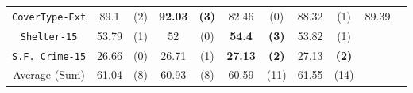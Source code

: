 \begin{table}
\begin{tabular}{c|cc|cc|cc|cc|cc}
{\tt CoverType-Ext}  &  89.1          &  (2)              &  {\bf 92.03}&  {\bf (3)}    &  82.46       &  (0)               &  88.32      & (1)           & 89.39 &    \\
{\tt Shelter-15}     &  53.79         &  (1)              &  52         &  (0)          &  {\bf 54.4}  &  {\bf (3)}         &  53.82      & (1)           &       &   \\   
{\tt S.F. Crime-15}  &  26.66         &  (0)              &  26.71      &  (1)          &  {\bf 27.13} &  {\bf (2)}         &  27.13      & {\bf (2)}     &       &   \\
\hline
Average (Sum)        &   61.04        &  (8)              & 60.93       &  (8)          &   60.59      &  (11)              &  61.55      & (14)          &       & 

\end{tabular}
\label{exp:numeric-16}
\normalsize
\end{table}

